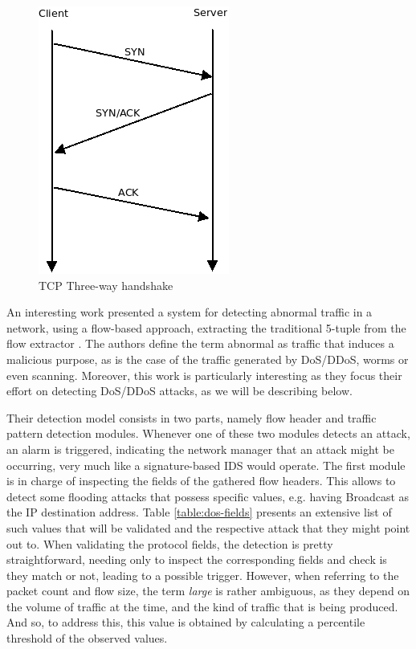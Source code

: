 \documentclass[runningheads,a4paper]{llncs}
\begin{document}
\begin{figure}[htp]
\centering
\includegraphics[scale=0.45]{3wh.png}
\caption{TCP Three-way handshake}
\label{fig:handshake}
\end{figure}

An interesting work presented a system for detecting abnormal traffic in a network, using a flow-based approach, extracting the traditional 5-tuple from the flow extractor \cite{kim2004flow}. The authors define the term abnormal as traffic that induces a malicious purpose, as is the case of the traffic generated by DoS/DDoS, worms or even scanning. Moreover, this work is particularly interesting as they focus their effort on detecting DoS/DDoS attacks, as we will be describing below.

Their detection model consists in two parts, namely flow header and traffic pattern detection modules. Whenever one of these two modules detects an attack, an alarm is triggered, indicating the network manager that an attack might be occurring, very much like a signature-based IDS would operate. The first module is in charge of inspecting the fields of the gathered flow headers. This allows to detect some flooding attacks that possess specific values, e.g. having Broadcast as the IP destination address. Table \ref{table:dos-fields} presents an extensive list of such values that will be validated and the respective attack that they might point out to. When validating the protocol fields, the detection is pretty straightforward, needing only to inspect the corresponding fields and check is they match or not, leading to a possible trigger. However, when referring to the packet count and flow size, the term \textit{large} is rather ambiguous, as they depend on the volume of traffic at the time, and the kind of traffic that is being produced. And so, to address this, this value is obtained by calculating a percentile threshold of the observed values.  
\end{document}
